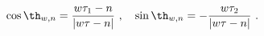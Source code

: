 \begin{equation}
\cos \th_{w,n}=\frac{w\tau_1-n}{|w\tau -n|}~,~~~
\sin \th_{w,n}=-\frac{w\tau_2 }{|w\tau -n|}~.
\label{th w n}
\end{equation}

